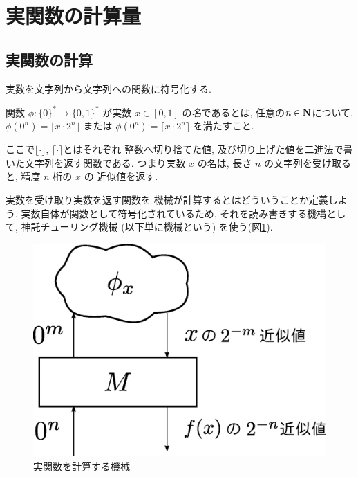 \section{実関数の計算量}
\label{section: preliminaries}

\subsection{実関数の計算}

実数を文字列から文字列への関数に符号化する.
 \begin{definition}
  関数 $\phi \colon \{0\} ^* \to \{0, 1\}^*$ が実数 $x \in [0,1]$ の\emph{名}であるとは,
任意の$n \in \mathbf N$について, 
  $\phi(0^n) = \lfloor x \cdot 2^n \rfloor$ または
  $\phi(0^n) = \lceil x \cdot 2^n \rceil$ を満たすこと.
 \end{definition}
ここで$\lfloor \cdot \rfloor$, $\lceil \cdot \rceil$とはそれぞれ
整数へ切り捨てた値, 及び切り上げた値を二進法で書いた文字列を返す関数である.
つまり実数 $x$ の名は, 
長さ $n$ の文字列を受け取ると, 精度 $n$ 桁の $x$ の
近似値を返す.

実数を受け取り実数を返す関数を
機械が計算するとはどういうことか定義しよう. 
実数自体が関数として符号化されているため, 
それを読み書きする機構として, 
神託チューリング機械 (以下単に機械という) を使う(図\ref{fig:model-of-function}).

 \begin{figure}
  \begin{center}
   \includegraphics[height=0.15\textheight]{image/model-of-function.eps}
  \end{center}
  \caption{実関数を計算する機械}
  \label{fig:model-of-function}
 \end{figure}

